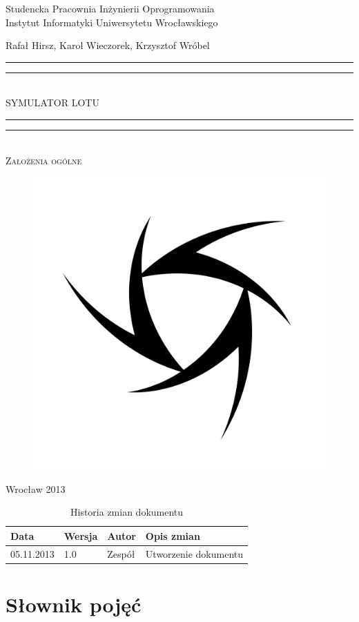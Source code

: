 \documentclass{mwrep}
\newcommand*{\titleGP}{\begingroup
\centering

{\large Studencka Pracownia Inżynierii Oprogramowania}\\Instytut Informatyki Uniwersytetu Wrocławskiego\par
\vspace*{16\baselineskip}

{\Large Rafał Hirsz, Karol Wieczorek, Krzysztof Wróbel\par}
\vspace*{\baselineskip}

\rule{\textwidth}{1.6pt}\vspace*{-\baselineskip}\vspace*{2pt}
\rule{\textwidth}{0.4pt}\\[\baselineskip]

{\Huge SYMULATOR LOTU}\\[0.2\baselineskip]

\rule{\textwidth}{0.4pt}\vspace*{-\baselineskip}\vspace{3.2pt}
\rule{\textwidth}{1.6pt}\\[\baselineskip]

\scshape
{\huge Założenia ogólne}\par
\vspace*{2\baselineskip}

\begin{figure}[h]
\centering
\includegraphics[width=5\baselineskip]{flightsim-team-logo.pdf}
\end{figure}
\vfill

{\large Wrocław 2013}\par

\pagebreak

\endgroup}
\begin{document}
\thispagestyle{empty}
\titleGP

\begin{center}
\begin{table}[h]
\begin{center}
\begin{tabularx}{1\textwidth}{|l|l|l|X|}
\hline
Data & Wersja & Autor & Opis zmian \\ \hline
05.11.2013 & 1.0 & Zespół & Utworzenie dokumentu \\
\hline
\end{tabularx}
\end{center}
\vspace{3ex}
\caption{Historia zmian dokumentu}\label{T:Zmiany}
\end{table}
\end{center}

\pagebreak

\tableofcontents

\chapter{Słownik pojęć}
\end{document}
